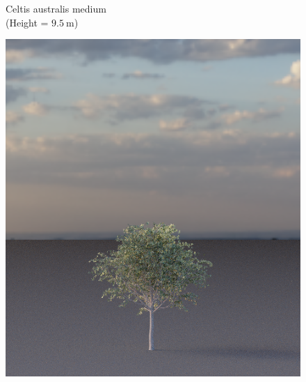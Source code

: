 \begin{figure}[t]
\begin{center}
        \begin{minipage}[c]{0.24\textwidth}
            \begin{flushleft}
                Celtis australis medium \\
                (Height = $\SI{9.5}{\m}$)
            \end{flushleft}
        \end{minipage}
        \begin{minipage}[c]{0.24\textwidth}
            \includegraphics[valign=c, width=\linewidth]{img/EU06m_mesh.png}
        \end{minipage}
        \begin{minipage}[c]{0.24\textwidth}

\end{minipage}
\end{center}
\end{figure}
